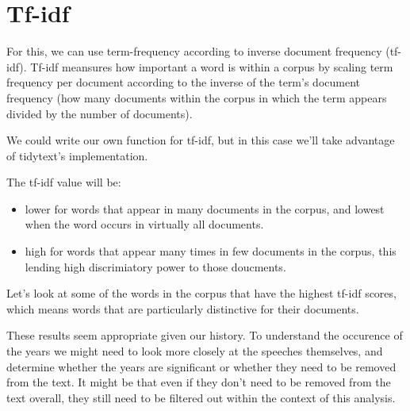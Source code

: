 \documentclass[]{book}
\newenvironment{Shaded}{\begin{snugshade}}{\end{snugshade}}
\newcommand{\KeywordTok}[1]{\textcolor[rgb]{0.13,0.29,0.53}{\textbf{#1}}}
\newcommand{\NormalTok}[1]{#1}
\newcommand{\OperatorTok}[1]{\textcolor[rgb]{0.81,0.36,0.00}{\textbf{#1}}}
\newcommand{\StringTok}[1]{\textcolor[rgb]{0.31,0.60,0.02}{#1}}
\providecommand{\tightlist}{%
  \setlength{\itemsep}{0pt}\setlength{\parskip}{0pt}}
\begin{document}
\hypertarget{tf-idf}{%
\section{Tf-idf}\label{tf-idf}}

For this, we can use term-frequency according to inverse document frequency (tf-idf). Tf-idf meansures how important a word is within a corpus by scaling term frequency per document according to the inverse of the term's document frequency (how many documents within the corpus in which the term appears divided by the number of documents).

We could write our own function for tf-idf, but in this case we'll take advantage of tidytext's implementation.

\begin{Shaded}
\end{Shaded}

The tf-idf value will be:

\begin{itemize}
\tightlist
\item
  lower for words that appear in many documents in the corpus, and lowest when the word occurs in virtually all documents.
\item
  high for words that appear many times in few documents in the corpus, this lending high discrimiatory power to those doucments.
\end{itemize}

Let's look at some of the words in the corpus that have the highest tf-idf scores, which means words that are particularly distinctive for their documents.

\begin{Shaded}
\end{Shaded}

These results seem appropriate given our history. To understand the occurence of the years we might need to look more closely at the speeches themselves, and determine whether the years are significant or whether they need to be removed from the text. It might be that even if they don't need to be removed from the text overall, they still need to be filtered out within the context of this analysis.
\end{document}
